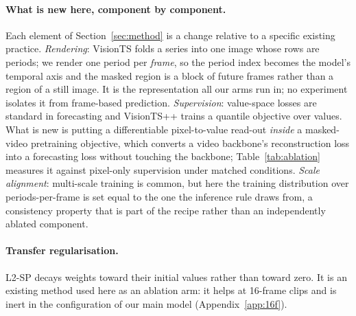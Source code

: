 \paragraph{What is new here, component by component.}
Each element of Section~\ref{sec:method} is a change relative to a specific existing practice.
\emph{Rendering}: VisionTS folds a series into one image whose rows are periods; we render one
period per \emph{frame}, so the period index becomes the model's temporal axis and the masked region
is a block of future frames rather than a region of a still image. It is the representation all our
arms run in; no experiment isolates it from frame-based prediction. \emph{Supervision}: value-space
losses are standard in forecasting and VisionTS++ trains a quantile objective over values. What is
new is putting a differentiable pixel-to-value read-out \emph{inside} a masked-video pretraining
objective, which converts a video backbone's reconstruction loss into a forecasting loss without
touching the backbone; Table~\ref{tab:ablation} measures it against pixel-only supervision under
matched conditions. \emph{Scale alignment}: multi-scale training is common, but here the training
distribution over periods-per-frame is set equal to the one the inference rule draws from, a
consistency property that is part of the recipe rather than an independently ablated component.

\paragraph{Transfer regularisation.}
L2-SP \citep{l2sp} decays weights toward their initial values rather than toward zero. It is an
existing method used here as an ablation arm: it helps at 16-frame clips and is inert in the
configuration of our main model (Appendix~\ref{app:16f}).

